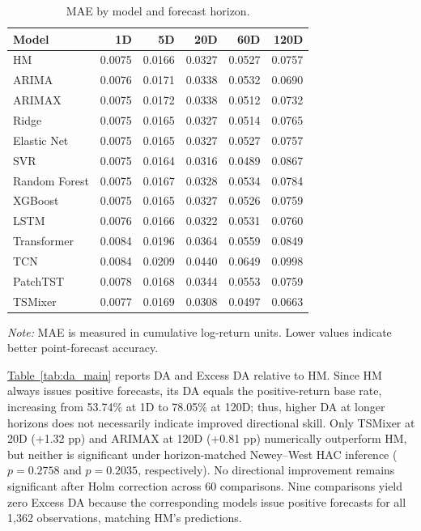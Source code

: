 \documentclass[runningheads,orivec]{llncs}
\begin{document}
\begin{table}[htbp]
\centering
\caption{MAE by model and forecast horizon.}\label{tab:mae_main}
\setlength{\tabcolsep}{4.5pt}
\begin{tabular}{lrrrrr}
\hline
Model & 1D & 5D & 20D & 60D & 120D \\
\hline
HM & 0.0075 & 0.0166 & 0.0327 & 0.0527 & 0.0757 \\
ARIMA & 0.0076 & 0.0171 & 0.0338 & 0.0532 & 0.0690 \\
ARIMAX & 0.0075 & 0.0172 & 0.0338 & 0.0512 & 0.0732 \\
Ridge & 0.0075 & 0.0165 & 0.0327 & 0.0514 & 0.0765 \\
Elastic Net & 0.0075 & 0.0165 & 0.0327 & 0.0527 & 0.0757 \\
SVR & 0.0075 & 0.0164 & 0.0316 & 0.0489 & 0.0867 \\
Random Forest & 0.0075 & 0.0167 & 0.0328 & 0.0534 & 0.0784 \\
XGBoost & 0.0075 & 0.0165 & 0.0327 & 0.0526 & 0.0759 \\
LSTM & 0.0076 & 0.0166 & 0.0322 & 0.0531 & 0.0760 \\
Transformer & 0.0084 & 0.0196 & 0.0364 & 0.0559 & 0.0849 \\
TCN & 0.0084 & 0.0209 & 0.0440 & 0.0649 & 0.0998 \\
PatchTST & 0.0078 & 0.0168 & 0.0344 & 0.0553 & 0.0759 \\
TSMixer & 0.0077 & 0.0169 & 0.0308 & 0.0497 & 0.0663 \\
\hline
\end{tabular}
\par\vspace{4pt}\parbox{0.85\linewidth}{\footnotesize\textit{Note:} MAE is measured in cumulative log-return units. Lower values indicate better point-forecast accuracy.}
\end{table}

\hyperref[tab:da_main]{Table~\ref*{tab:da_main}} reports DA and Excess DA relative to HM. Since HM always issues positive forecasts, its DA equals the positive-return base rate, increasing from 53.74\% at 1D to 78.05\% at 120D; thus, higher DA at longer horizons does not necessarily indicate improved directional skill. Only TSMixer at 20D (+1.32 pp) and ARIMAX at 120D (+0.81 pp) numerically outperform HM, but neither is significant under horizon-matched Newey--West HAC inference ($p = 0.2758$ and $p = 0.2035$, respectively). No directional improvement remains significant after Holm correction across 60 comparisons. Nine comparisons yield zero Excess DA because the corresponding models issue positive forecasts for all 1,362 observations, matching HM's predictions.
\end{document}

